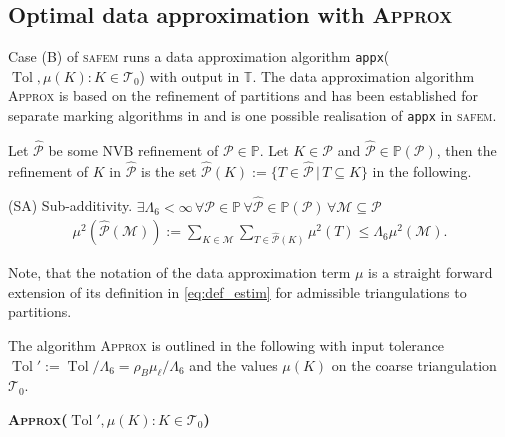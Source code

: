 \documentclass{siamltex1213}
\begin{document}
\subsection{Optimal data approximation with {{\scshape Approx}\xspace}}\label{sec:optApprox}
Case (B) of {\textsc{safem}\xspace} runs a data approximation algorithm \texttt{appx}($\operatorname{Tol}, \mu(K):K \in {\mathcal T_{0}}$) 
with output in ${\mathbb T}$. The  data approximation algorithm   {{\scshape Approx}\xspace}  \cite{BDD04,BD04} is based on the refinement of partitions and has been  established for separate marking algorithms   in \cite{CR09,safem2015} and is one possible realisation of \texttt{appx} in {\textsc{safem}\xspace}. 

Let $\hat {\mathcal{P}}$ be some NVB refinement of ${\mathcal{P}} \in {\mathbb P}$.  Let $K\in {\mathcal{P}}$ and $\hat {\mathcal{P}} \in {\mathbb P\left({\mathcal{P}}\right)}$, then the refinement of $K$ in $\hat {\mathcal{P}}$ 
is the set $\hat {\mathcal{P}}(K):= \lbrace T \in \hat {\mathcal{P}} \, \vert \, T\subseteq K \rbrace$  in 
the following.

\begin{axioms}
\item[(SA)] Sub-additivity. 
$\exists {\ensuremath{\Lambda_{\mathrm{6}}}}<\infty \, \forall {\mathcal{P}} \in {\mathbb P} \, \forall \hat {\mathcal{P}} \in {\mathbb P\left({\mathcal{P}}\right)} \, \forall {\mathcal{M}} \subseteq {\mathcal{P}}$ 
	\begin{align}\label{eq:B1}\tag{SA}
		\mu^2(\hat {\mathcal{P}}({\mathcal{M}})):=\sum_{K \in {\mathcal{M}}} \sum_{T \in \hat {\mathcal{P}}(K)} \mu^2(T) 
				\leq {\ensuremath{\Lambda_{\mathrm{6}}}} \mu^2({\mathcal{M}}).	
 	\end{align}
\end{axioms}
Note, that the notation of the data approximation term $\mu$ is a straight forward extension of its definition in \eqref{eq:def_estim} for admissible triangulations to partitions.

The algorithm {{\scshape Approx}\xspace} is outlined in the following with input tolerance 
$\operatorname{Tol}':= \operatorname{Tol}/{\ensuremath{\Lambda_{\mathrm{6}}}}=\rho_B \mu_\ell / {\ensuremath{\Lambda_{\mathrm{6}}}}$ and the values $\mu(K)$ on the coarse triangulation ${\mathcal T_{0}}$.
\medskip

\textbf{{{\scshape Approx}\xspace}($\operatorname{Tol}', \mu(K):K\in{\mathcal T_{0}}$)} \\

\end{document}
